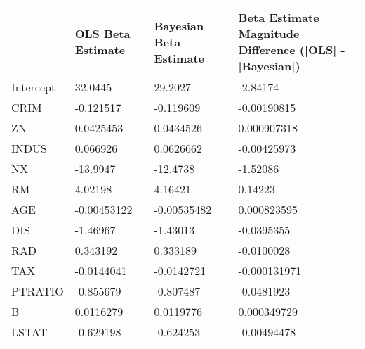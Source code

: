 \begin{tabular}{llll}
\hline
           & OLS Beta Estimate   & Bayesian Beta Estimate   & Beta Estimate Magnitude Difference (|OLS| - |Bayesian|)   \\
\hline
 Intercept & 32.0445             & 29.2027                  & -2.84174                                                  \\
 CRIM      & -0.121517           & -0.119609                & -0.00190815                                               \\
 ZN        & 0.0425453           & 0.0434526                & 0.000907318                                               \\
 INDUS     & 0.066926            & 0.0626662                & -0.00425973                                               \\
 NX        & -13.9947            & -12.4738                 & -1.52086                                                  \\
 RM        & 4.02198             & 4.16421                  & 0.14223                                                   \\
 AGE       & -0.00453122         & -0.00535482              & 0.000823595                                               \\
 DIS       & -1.46967            & -1.43013                 & -0.0395355                                                \\
 RAD       & 0.343192            & 0.333189                 & -0.0100028                                                \\
 TAX       & -0.0144041          & -0.0142721               & -0.000131971                                              \\
 PTRATIO   & -0.855679           & -0.807487                & -0.0481923                                                \\
 B         & 0.0116279           & 0.0119776                & 0.000349729                                               \\
 LSTAT     & -0.629198           & -0.624253                & -0.00494478                                               \\
\hline
\end{tabular}